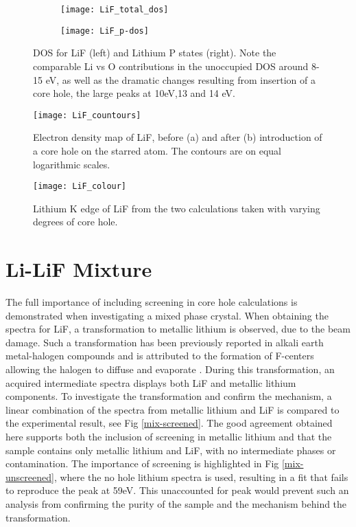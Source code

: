 \begin{figure}
	\centering
	\begin{subfigure}{0.45\textwidth}
		\texttt{[image: LiF\_total\_dos]}
	\end{subfigure}
	\hspace{-0.01cm}
	\begin{subfigure}{0.45\textwidth}
		\texttt{[image: LiF\_p-dos]}
	\end{subfigure}
	
	\caption{DOS for LiF (left) and Lithium P states (right).  Note the comparable Li vs O contributions in the unoccupied DOS around 8-15 eV, as well as the dramatic changes resulting from insertion of a core hole, the large peaks at 10eV,13 and 14 eV.}
	\label{LiF_dos}
\end{figure}


\begin{figure}
	\centering
	\texttt{[image: LiF\_countours]}
	\caption{Electron density map of LiF, before (a) and after (b) introduction of a core hole on the starred atom.  The contours are on equal logarithmic scales.}
	\label{LiF_countours}
\end{figure}

\begin{figure}
	\centering
	\texttt{[image: LiF\_colour]}
	\caption{Lithium K edge of LiF from the two calculations taken with varying degrees of core hole. }
	\label{LiF_spectra}
\end{figure}



\section{Li-LiF Mixture}
The full importance of including screening in core hole calculations is demonstrated when investigating a mixed phase crystal.  When obtaining the spectra for LiF, a transformation to metallic lithium is observed, due to the beam damage.  Such a transformation has been previously reported in alkali earth metal-halogen compounds and is attributed to the formation of F-centers allowing the halogen to diffuse and evaporate \cite{egerton_electron_1987}.  During this transformation, an acquired intermediate spectra displays both LiF and metallic lithium components.  To investigate the transformation and confirm the mechanism, a linear combination of the spectra from metallic lithium and LiF is compared to the experimental result, see Fig \ref{mix-screened}.  The good agreement obtained here supports both the inclusion of screening in metallic lithium and that the sample contains only metallic lithium and LiF, with no intermediate phases or contamination.  The importance of screening is highlighted in Fig \ref{mix-unscreened}, where the no hole lithium spectra is used, resulting in a  fit that fails to reproduce the peak at 59eV.  This unaccounted for peak would prevent such an  analysis from confirming the purity of the sample and the mechanism behind the transformation.  


